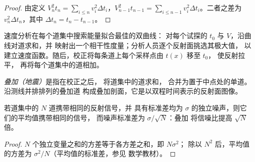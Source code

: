 \begin{proof}
由定义 $V_n^2t_n = \sum_{i\le n}v_i^2\Delta t_i$，$V_{n-1}^2t_{n-1}
= \sum_{i\le n-1}v_i^2\Delta t_i$。二者之差为 $v_n^2\Delta t_n$，其中
$\Delta t_n = t_n - t_{n-1}$。
\end{proof}

速度分析在每个道集中搜索能量拟合最佳的双曲线：
对每个试探的 $t_0$ 与 $V$，沿曲线对道求和，并
映射出一个相干性度量；分析人员逐个反射面挑选其极大值，
以建立速度函数。随后，校正将每条道上每个采样点由 $t(x)$ 移至 $t_0$，
使反射拉平，
再将每个道集中的道相加。

\begin{definition}[叠加（地震）]\label{def:b3:exploration-seismology:stack}
\emph{叠加（地震）}是指在校正之后，
将道集中的道求和，
合并为置于中点处的单道。沿测线并排排列的叠加道
构成叠加剖面，它是以双程时间表示的反射面图像。
\end{definition}

\begin{proposition}[叠加的增益]\label{prop:b3:exploration-seismology:sqrtN}
若道集中的 $N$ 道携带相同的反射信号，并
具有标准差均为 $\sigma$ 的独立噪声，则它们的平均值携带相同的信号，
而噪声标准差为 $\sigma/\sqrt N$：叠加
将信噪比提高 $\sqrt N$ 倍。
\end{proposition}

\begin{proof}
$N$ 个独立变量之和的方差等于各方差之和，即 $N\sigma^2$；
除以 $N^2$ 后，平均值的方差为
$\sigma^2/N$（平均值的标准差，参见
数学教材）。
\end{proof}

